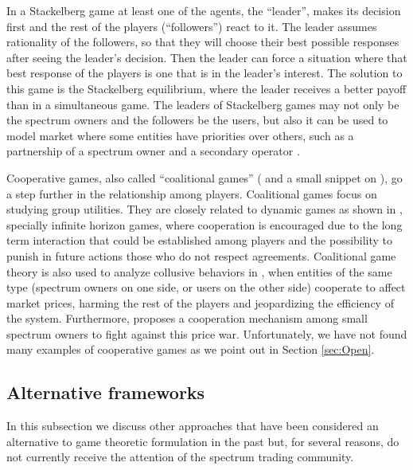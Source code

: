 In a Stackelberg game \cite{ref:Simeone2008,ref:Zhang2009,ref:Yi2010,ref:Vazquez2010,ref:Duan2010_Cog,ref:Duan2011_Inves,ref:Zhu2012_Dyn} at least one of the agents, the ``leader'',  makes its decision first and the rest of the players (``followers'') react to it. 
The leader assumes rationality of the followers, so that they will choose their best possible responses after seeing the leader's decision.
Then the leader can force a situation where that best response of the players is one that is in the leader's interest. 
The solution to this game is the Stackelberg equilibrium, where the leader receives a better payoff than in a simultaneous game. 
The leaders of Stackelberg games may not only be the spectrum owners and the followers be the users, but also it can be used to model market where some entities have priorities over others, such as a partnership of a spectrum owner and a secondary operator \cite{ref:Zhu2012_Dyn}. 

Cooperative games, also called ``coalitional games'' (\cite{ref:Li2011} and a small snippet on \cite{ref:Xing2007}), go a step further in the relationship among players. 
Coalitional games focus on studying group utilities. 
They are closely related to dynamic games as shown in \cite{ref:Niyato2008_Comp}, specially infinite horizon games, where cooperation is encouraged due to the long term interaction that could be established among players and the possibility to punish in future actions those who do not respect agreements.
Coalitional game theory is also used to analyze collusive behaviors in \cite{ref:Ji2008,ref:Tan2010,ref:Sengupta2007}, when entities of the same type (spectrum owners on one side, or users on the other side) cooperate to affect market prices, harming the rest of the players and jeopardizing the efficiency of the system. 
Furthermore, \cite{ref:Tan2010} proposes a cooperation mechanism among small spectrum owners to fight against this price war. 
Unfortunately, we have not found many examples of cooperative games as we point out in Section \ref{sec:Open}.

\subsection{Alternative frameworks}\label{sec:Deprecated}
In this subsection we discuss other approaches that have been considered an alternative to game theoretic formulation in the past but, for several reasons, do not currently receive the attention of the spectrum trading community. 
